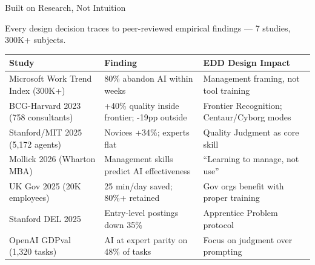 \documentclass[aspectratio=169,11pt]{beamer}
\begin{document}
\begin{frame}[shrink=10]{Built on Research, Not Intuition}

{\small Every design decision traces to peer-reviewed empirical findings --- 7 studies, 300K+ subjects.}

\vspace{2pt}

\renewcommand{\arraystretch}{1.05}
{\footnotesize
\begin{tabular}{@{}p{3.8cm}p{5.2cm}p{4.8cm}@{}}
\toprule
\textbf{Study} & \textbf{Finding} & \textbf{EDD Design Impact} \\
\midrule
Microsoft Work Trend Index (300K+) &
  80\% abandon AI within weeks &
  Management framing, not tool training \\
BCG-Harvard 2023 (758 consultants) &
  +40\% quality inside frontier; -19pp outside &
  Frontier Recognition; Centaur/Cyborg modes \\
Stanford/MIT 2025 (5,172 agents) &
  Novices +34\%; experts flat &
  Quality Judgment as core skill \\
Mollick 2026 (Wharton MBA) &
  Management skills predict AI effectiveness &
  ``Learning to manage, not use'' \\
UK Gov 2025 (20K employees) &
  25 min/day saved; 80\%+ retained &
  Gov orgs benefit with proper training \\
Stanford DEL 2025 &
  Entry-level postings down 35\% &
  Apprentice Problem protocol \\
OpenAI GDPval (1,320 tasks) &
  AI at expert parity on 48\% of tasks &
  Focus on judgment over prompting \\
\bottomrule
\end{tabular}
}

\end{frame}
\end{document}
